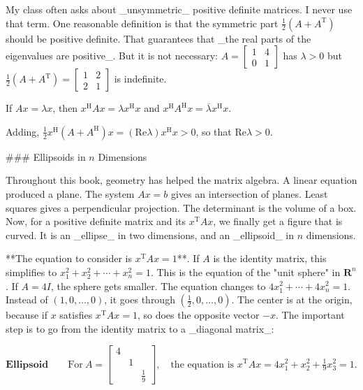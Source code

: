 My class often asks about _unsymmetric_ positive definite matrices. I never use that term. One reasonable definition is that the symmetric part \(\frac{1}{2}(A+A^{\mathrm{T}})\) should be positive definite. That guarantees that _the real parts of the eigenvalues are positive_. But it is not necessary: \(A=\left[\begin{smallmatrix}1&4\\ 0&1\end{smallmatrix}\right]\) has \(\lambda>0\) but \(\frac{1}{2}(A+A^{\mathrm{T}})=\left[\begin{smallmatrix}1&2\\ 2&1\end{smallmatrix}\right]\) is indefinite.

If \(Ax=\lambda x\), then \(x^{\mathrm{H}}Ax=\lambda x^{\mathrm{H}}x\) and \(x^{\mathrm{H}}A^{\mathrm{H}}x=\overline{\lambda}x^{\mathrm{H}}x\).

Adding, \(\frac{1}{2}x^{\mathrm{H}}(A+A^{\mathrm{H}})x=(\mathrm{Re}\lambda)x^{\mathrm{H }}x>0\), so that \(\mathrm{Re}\lambda>0\).

### Ellipsoids in \(n\) Dimensions

Throughout this book, geometry has helped the matrix algebra. A linear equation produced a plane. The system \(Ax=b\) gives an intersection of planes. Least squares gives a perpendicular projection. The determinant is the volume of a box. Now, for a positive definite matrix and its \(x^{\mathrm{T}}Ax\), we finally get a figure that is curved. It is an _ellipse_ in two dimensions, and an _ellipsoid_ in \(n\) dimensions.

**The equation to consider is \(x^{\mathrm{T}}Ax=1\)**. If \(A\) is the identity matrix, this simplifies to \(x_{1}^{2}+x_{2}^{2}+\cdots+x_{n}^{2}=1\). This is the equation of the "unit sphere" in \(\mathbf{R}^{n}\). If \(A=4I\), the sphere gets smaller. The equation changes to \(4x_{1}^{2}+\cdots+4x_{n}^{2}=1\). Instead of \((1,0,\ldots,0)\), it goes through \((\frac{1}{2},0,\ldots,0)\). The center is at the origin, because if \(x\) satisfies \(x^{\mathrm{T}}Ax=1\), so does the opposite vector \(-x\). The important step is to go from the identity matrix to a _diagonal matrix_:

\[\mathbf{Ellipsoid}\qquad\mathrm{For}\:A=\left[\begin{matrix}4&&\\ &1&\\ &&\frac{1}{9}\end{matrix}\right],\quad\text{the equation is }x^{\mathrm{T}}Ax=4x_{1}^{2}+x_{2}^{2}+ \tfrac{1}{9}x_{3}^{2}=1.\]


